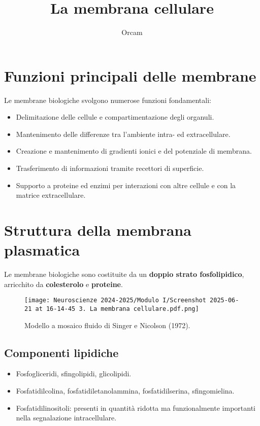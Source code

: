 \documentclass[a4paper,12pt]{article}
\title{La membrana cellulare}
\author{Orcam}
\date{}
\begin{document}
\maketitle

\section*{Funzioni principali delle membrane}

Le membrane biologiche svolgono numerose funzioni fondamentali:
\begin{itemize}
    \item Delimitazione delle cellule e compartimentazione degli organuli.
    \item Mantenimento delle differenze tra l’ambiente intra- ed extracellulare.
    \item Creazione e mantenimento di gradienti ionici e del potenziale di membrana.
    \item Trasferimento di informazioni tramite recettori di superficie.
    \item Supporto a proteine ed enzimi per interazioni con altre cellule e con la matrice extracellulare.
\end{itemize}

\section*{Struttura della membrana plasmatica}

Le membrane biologiche sono costituite da un \textbf{doppio strato fosfolipidico}, arricchito da \textbf{colesterolo} e \textbf{proteine}.

\begin{figure}[h!]
    \centering
    \texttt{[image: Neuroscienze 2024-2025/Modulo I/Screenshot 2025-06-21 at 16-14-45 3. La membrana cellulare.pdf.png]}
    \caption{Modello a mosaico fluido di Singer e Nicolson (1972).}
\end{figure}

\subsection*{Componenti lipidiche}
\begin{itemize}
    \item Fosfogliceridi, sfingolipidi, glicolipidi.
    \item Fosfatidilcolina, fosfatidiletanolammina, fosfatidilserina, sfingomielina.
    \item Fosfatidilinositoli: presenti in quantità ridotta ma funzionalmente importanti nella segnalazione intracellulare.
\end{itemize}
\end{document}
